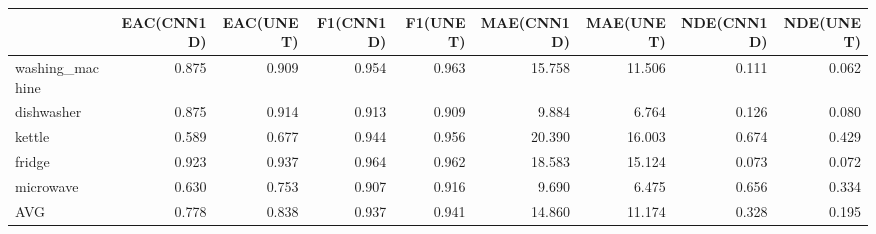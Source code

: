 \begin{tabular}{lrrrrrrrr}
\toprule
{} &  EAC(CNN1D) &  EAC(UNET) &  F1(CNN1D) &  F1(UNET) &  MAE(CNN1D) &  MAE(UNET) &  NDE(CNN1D) &  NDE(UNET) \\
\midrule
washing\_machine &       0.875 &      0.909 &      0.954 &     0.963 &      15.758 &     11.506 &       0.111 &      0.062 \\
dishwasher      &       0.875 &      0.914 &      0.913 &     0.909 &       9.884 &      6.764 &       0.126 &      0.080 \\
kettle          &       0.589 &      0.677 &      0.944 &     0.956 &      20.390 &     16.003 &       0.674 &      0.429 \\
fridge          &       0.923 &      0.937 &      0.964 &     0.962 &      18.583 &     15.124 &       0.073 &      0.072 \\
microwave       &       0.630 &      0.753 &      0.907 &     0.916 &       9.690 &      6.475 &       0.656 &      0.334 \\
AVG             &       0.778 &      0.838 &      0.937 &     0.941 &      14.860 &     11.174 &       0.328 &      0.195 \\
\bottomrule
\end{tabular}
